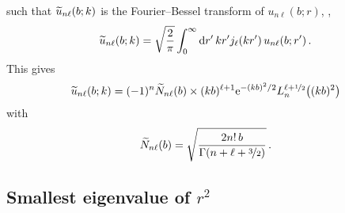   such that $\widetilde{u}_{n\ell}(b;k)$ is the Fourier--Bessel transform of
  $u_{n\ell}(b;r)$, \ie,
  \begin{equation}
   \widetilde{u}_{n\ell}(b;k) = \sqrt{\frac{2}{\pi}}\int_0^\infty\mathrm{d} r'\,
   kr' j_\ell(kr')\,u_{n\ell}(b;r') \,.
  \label{eq:uK-FB}
  \end{equation}
  This gives
  \begin{equation}
   \widetilde{u}_{n\ell}(b;k) = (-1)^n\widetilde{N}_{n\ell}(b)\times(kb)^{\ell+1}
   \mathrm{e}^{-(kb)^2/2} L_n^{\ell+\nicefrac12}\big((kb)^2\big)
  \label{eq:uK}
  \end{equation}
  with
  \begin{equation}
   \widetilde{N}_{n\ell}(b) = \sqrt{\frac{2n!\,b}{\Gamma(n+\ell+\nicefrac32)}} \,.
  \label{eq:N-tilde}
  \end{equation}

  \subsection{Smallest eigenvalue of $r^2$}

